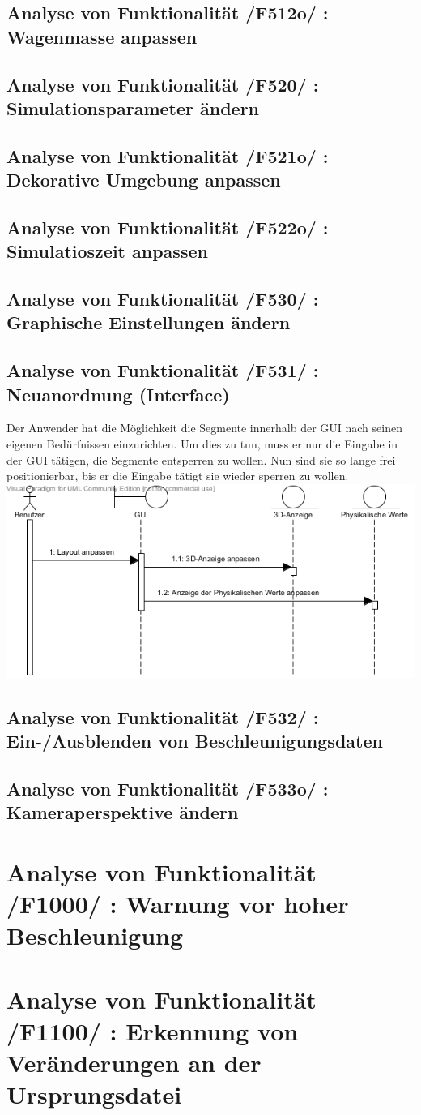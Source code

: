 \subsection{Analyse von Funktionalität /F512o/ :  Wagenmasse anpassen}
\subsection{Analyse von Funktionalität /F520/ :  Simulationsparameter ändern}
\subsection{Analyse von Funktionalität /F521o/ :  Dekorative Umgebung anpassen}
\subsection{Analyse von Funktionalität /F522o/ :  Simulatioszeit anpassen}
\subsection{Analyse von Funktionalität /F530/ :  Graphische Einstellungen ändern}
\subsection{Analyse von Funktionalität /F531/ :   Neuanordnung (Interface)}
Der Anwender hat die Möglichkeit die Segmente innerhalb der GUI nach seinen eigenen Bedürfnissen einzurichten. Um dies zu tun, muss er nur die Eingabe in der GUI tätigen, die Segmente entsperren zu wollen.
Nun sind sie so lange frei positionierbar, bis er die Eingabe tätigt sie wieder sperren zu wollen.
\includegraphics[width=16cm]{bilder/Interface_Neuanordnung}
\subsection{Analyse von Funktionalität /F532/ :  Ein-/Ausblenden von Beschleunigungsdaten}
\subsection{Analyse von Funktionalität /F533o/ :  Kameraperspektive ändern}
\section{Analyse von Funktionalität /F1000/ :  Warnung vor hoher Beschleunigung}
\section{Analyse von Funktionalität /F1100/ :  Erkennung von Veränderungen an der Ursprungsdatei}